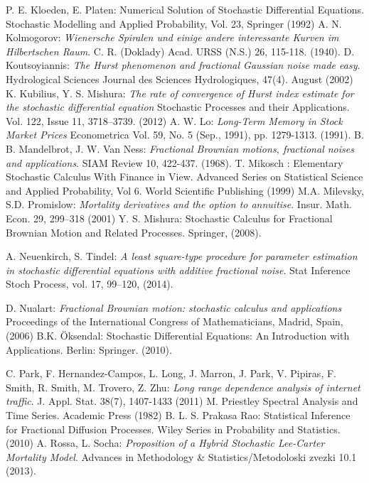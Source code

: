 \documentclass[smallextended]{svjour3}
\begin{document}
\begin{thebibliography}{99}
    
     P. E. Kloeden, E. Platen: Numerical Solution of Stochastic 
    Differential Equations. Stochastic
    Modelling and Applied Probability, Vol. 23, Springer (1992)
      A. N. Kolmogorov: {\it Wienersche Spiralen und einige andere 
    interessante Kurven  im
        Hilbertschen Raum}. C. R. (Doklady) Acad. URSS (N.S.) 26, 115-118. 
        (1940).
     D. Koutsoyiannis: {\it The Hurst phenomenon and fractional 
    Gaussian noise made easy}.
    Hydrological Sciences Journal des Sciences Hydrologiques, 47(4). August 
    (2002)
     K. Kubilius, Y. S. Mishura: {\it The rate of convergence of 
    Hurst index estimate for the stochastic differential equation}
    Stochastic Processes and their Applications. Vol. 122, Issue 11,  
    3718–3739. (2012)
     A. W. Lo: {\it Long-Term Memory in Stock Market Prices}  
    Econometrica Vol. 59, No. 5 (Sep., 1991), pp. 1279-1313. (1991).
      B. B. Mandelbrot, J. W. Van Ness: {\it Fractional Brownian 
    motions, fractional noises and
        applications}. SIAM Review 10, 422-437. (1968).
     T. Mikosch : Elementary Stochastic Calculus With Finance in 
    View. Advanced Series on Statistical Science and Applied
    Probability, Vol 6. World Scientific Publishing (1999)
      M.A. Milevsky, S.D. Promislow: {\it Mortality derivatives 
    and the option to annuitise}. Insur. Math.
    Econ. 29, 299–318 (2001)
      Y. S. Mishura: Stochastic Calculus for Fractional Brownian 
    Motion and Related Processes.
    Springer, (2008).
    
     A. Neuenkirch, S. Tindel: {\it A least square-type 
    procedure for parameter estimation in stochastic differential
        equations with additive fractional noise}. Stat Inference Stoch 
        Process, vol. 17, 99–120, (2014).
    
    
     D. Nualart: {\it Fractional Brownian motion: stochastic 
    calculus and applications }
    Proceedings of the International Congress of Mathematicians, Madrid, Spain, 
    (2006)
     B.K. \"Oksendal: Stochastic Differential Equations: An 
    Introduction with Applications. Berlin: Springer.  (2010).
    
     C. Park, F. Hernandez-Campos, L. Long, J. Marron, J. 
    Park, V. Pipiras, F. Smith, R. Smith, M. Trovero, Z. Zhu:
    {\it Long range dependence analysis of internet traffic}. J. Appl. Stat. 
    38(7), 1407-1433 (2011)
     M. Priestley Spectral Analysis and Time Series. 
    Academic Press (1982)
     B. L. S. Prakasa Rao: Statistical Inference for Fractional 
    Diffusion Processes. Wiley Series in Probability and Statistics.
    (2010)
     A. Rossa, L. Socha: {\it Proposition of a Hybrid Stochastic 
    Lee-Carter Mortality Model}. Advances in Methodology \&
    Statistics/Metodoloski zvezki 10.1 (2013).
    

\end{thebibliography}
\end{document}
